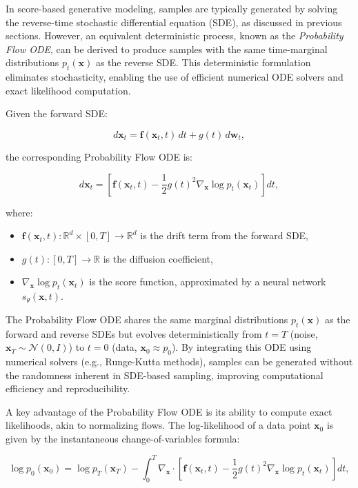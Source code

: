 \documentclass[12pt]{article}
\begin{document}
In score-based generative modeling, samples are typically generated by solving the reverse-time stochastic differential equation (SDE), as discussed in previous sections. However, an equivalent deterministic process, known as the \emph{Probability Flow ODE}, can be derived to produce samples with the same time-marginal distributions $p_t(\mathbf{x})$ as the reverse SDE. This deterministic formulation eliminates stochasticity, enabling the use of efficient numerical ODE solvers and exact likelihood computation.

Given the forward SDE:

\begin{equation}
    d\mathbf{x}_t = \mathbf{f}(\mathbf{x}_t, t) \, dt + g(t) \, d\mathbf{w}_t,
\end{equation}

the corresponding Probability Flow ODE is:

\begin{equation}
    d\mathbf{x}_t = \left[ \mathbf{f}(\mathbf{x}_t, t) - \frac{1}{2} g(t)^2 \nabla_{\mathbf{x}} \log p_t(\mathbf{x}_t) \right] dt,
\end{equation}

where:
\begin{itemize}
    \item $\mathbf{f}(\mathbf{x}_t, t): \mathbb{R}^d \times [0, T] \to \mathbb{R}^d$ is the drift term from the forward SDE,
    \item $g(t): [0, T] \to \mathbb{R}$ is the diffusion coefficient,
    \item $\nabla_{\mathbf{x}} \log p_t(\mathbf{x}_t)$ is the score function, approximated by a neural network $s_\theta(\mathbf{x}, t)$.
\end{itemize}

The Probability Flow ODE shares the same marginal distributions $p_t(\mathbf{x})$ as the forward and reverse SDEs but evolves deterministically from $t=T$ (noise, $\mathbf{x}_T \sim \mathcal{N}(0, I)$) to $t=0$ (data, $\mathbf{x}_0 \approx p_0$). By integrating this ODE using numerical solvers (e.g., Runge-Kutta methods), samples can be generated without the randomness inherent in SDE-based sampling, improving computational efficiency and reproducibility.

A key advantage of the Probability Flow ODE is its ability to compute exact likelihoods, akin to normalizing flows. The log-likelihood of a data point $\mathbf{x}_0$ is given by the instantaneous change-of-variables formula:

\begin{equation}
    \log p_0(\mathbf{x}_0) = \log p_T(\mathbf{x}_T) - \int_0^T \nabla_{\mathbf{x}} \cdot \left[ \mathbf{f}(\mathbf{x}_t, t) - \frac{1}{2} g(t)^2 \nabla_{\mathbf{x}} \log p_t(\mathbf{x}_t) \right] dt,
\end{equation}
\end{document}
